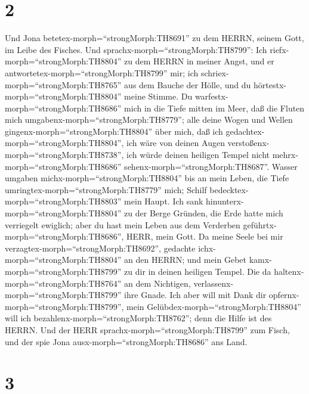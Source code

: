 \hypertarget{section-1}{%
\section{2}\label{section-1}}

 Und Jona betetex-morph=``strongMorph:TH8691'' zu dem HERRN,
seinem Gott, im Leibe des Fisches.  Und
sprachx-morph=``strongMorph:TH8799'': Ich
riefx-morph=``strongMorph:TH8804'' zu dem HERRN in meiner Angst, und er
antwortetex-morph=``strongMorph:TH8799'' mir; ich
schriex-morph=``strongMorph:TH8765'' aus dem Bauche der Hölle, und du
hörtestx-morph=``strongMorph:TH8804'' meine Stimme.  Du
warfestx-morph=``strongMorph:TH8686'' mich in die Tiefe mitten im Meer,
daß die Fluten mich umgabenx-morph=``strongMorph:TH8779''; alle deine
Wogen und Wellen gingenx-morph=``strongMorph:TH8804'' über mich,
 daß ich gedachtex-morph=``strongMorph:TH8804'', ich wäre
von deinen Augen verstoßenx-morph=``strongMorph:TH8738'', ich würde
deinen heiligen Tempel nicht mehrx-morph=``strongMorph:TH8686''
sehenx-morph=``strongMorph:TH8687''.  Wasser umgaben
michx-morph=``strongMorph:TH8804'' bis an mein Leben, die Tiefe
umringtex-morph=``strongMorph:TH8779'' mich; Schilf
bedecktex-morph=``strongMorph:TH8803'' mein Haupt.  Ich sank
hinunterx-morph=``strongMorph:TH8804'' zu der Berge Gründen, die Erde
hatte mich verriegelt ewiglich; aber du hast mein Leben aus dem
Verderben geführtx-morph=``strongMorph:TH8686'', HERR, mein Gott.
 Da meine Seele bei mir
verzagtex-morph=``strongMorph:TH8692'', gedachte
ichx-morph=``strongMorph:TH8804'' an den HERRN; und mein Gebet
kamx-morph=``strongMorph:TH8799'' zu dir in deinen heiligen Tempel.
 Die da haltenx-morph=``strongMorph:TH8764'' an dem
Nichtigen, verlassenx-morph=``strongMorph:TH8799'' ihre Gnade.
 Ich aber will mit Dank dir
opfernx-morph=``strongMorph:TH8799'', mein
Gelübdex-morph=``strongMorph:TH8804'' will ich
bezahlenx-morph=``strongMorph:TH8762''; denn die Hilfe ist des HERRN.
 Und der HERR sprachx-morph=``strongMorph:TH8799'' zum
Fisch, und der spie Jona ausx-morph=``strongMorph:TH8686'' ans Land.

\hypertarget{section-2}{%
\section{3}\label{section-2}}

